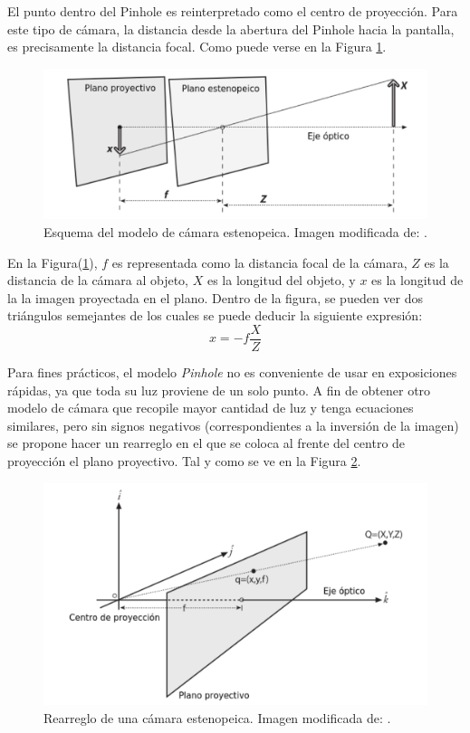 El punto dentro del Pinhole es reinterpretado como el centro de proyección. Para este tipo de cámara, la distancia desde la abertura del Pinhole hacia la pantalla, es precisamente la distancia focal. Como puede verse en la Figura \ref{fig:pinholeScheme}.\\
	
\begin{figure}
	\centering		
	\includegraphics[scale=0.8]{images/pinholeScheme.pdf}
	\caption{Esquema del modelo de cámara estenopeica. Imagen modificada de: \cite{bradski2008learning}.}		
	\label{fig:pinholeScheme}
\end{figure}

En la Figura(\ref{fig:pinholeScheme}), $f$ es representada como la distancia focal de la cámara, $Z$ es la distancia de la cámara al objeto, $X$ es la longitud del objeto, y $x$ es la longitud de la la imagen proyectada en el plano. Dentro de la figura, se pueden ver dos triángulos semejantes de los cuales se puede deducir la siguiente expresión:
\[x = -f \frac{X}{Z}\]
	
Para fines prácticos, el modelo \textit{Pinhole} no es conveniente de usar en exposiciones rápidas, ya que toda su luz proviene de un solo punto. A fin de obtener otro modelo de cámara que recopile mayor cantidad de luz y tenga ecuaciones similares, pero sin signos negativos (correspondientes a la inversión de la imagen) se propone hacer un rearreglo en el que se coloca al frente del centro de proyección el plano proyectivo. Tal y como se ve en la Figura \ref{fig:rearrange_pinhole_scheme}.
	
\begin{figure}
	\centering
	\includegraphics[scale=0.8]{images/rearrange_pinhole_scheme.pdf}
    \caption{Rearreglo de una cámara estenopeica. Imagen modificada de: \cite{bradski2008learning}.}
    \label{fig:rearrange_pinhole_scheme}
\end{figure} 

